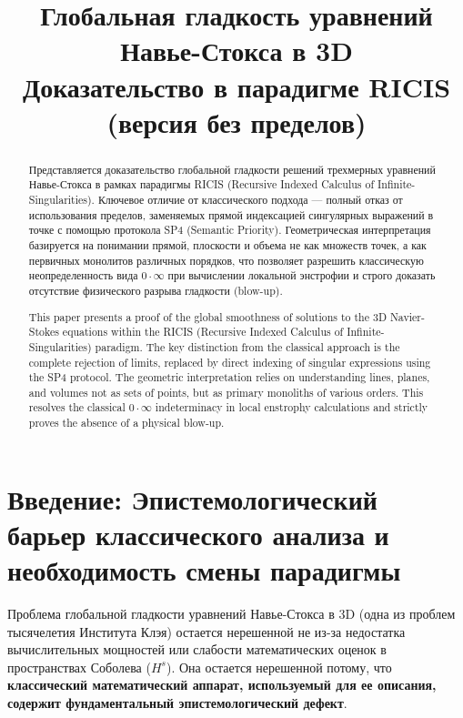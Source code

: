 \documentclass[12pt]{article}
\title{Глобальная гладкость уравнений Навье-Стокса в 3D \\
\large Доказательство в парадигме RICIS (версия без пределов)}
\author{}
\date{}
\newcommand{\0}{\mathbf{0}}
\newcommand{\1}{\mathds{1}}
\begin{document}
\maketitle

\begin{abstract}
Представляется доказательство глобальной гладкости решений трехмерных уравнений Навье-Стокса в рамках парадигмы RICIS (Recursive Indexed Calculus of Infinite-Singularities). Ключевое отличие от классического подхода --- полный отказ от использования пределов, заменяемых прямой индексацией сингулярных выражений в точке с помощью протокола SP4 (Semantic Priority). Геометрическая интерпретация базируется на понимании прямой, плоскости и объема не как множеств точек, а как первичных монолитов различных порядков, что позволяет разрешить классическую неопределенность вида $0 \cdot \infty$ при вычислении локальной энстрофии и строго доказать отсутствие физического разрыва гладкости (blow-up).
\end{abstract}
\renewcommand{\abstractname}{Abstract}
\begin{abstract}
This paper presents a proof of the global smoothness of solutions to the 3D Navier-Stokes equations within the RICIS (Recursive Indexed Calculus of Infinite-Singularities) paradigm. The key distinction from the classical approach is the complete rejection of limits, replaced by direct indexing of singular expressions using the SP4 protocol. The geometric interpretation relies on understanding lines, planes, and volumes not as sets of points, but as primary monoliths of various orders. This resolves the classical $0 \cdot \infty$ indeterminacy in local enstrophy calculations and strictly proves the absence of a physical blow-up.
\end{abstract}

\tableofcontents
\vspace{1cm}

\section*{Введение: Эпистемологический барьер классического анализа и необходимость смены парадигмы}

Проблема глобальной гладкости уравнений Навье-Стокса в 3D (одна из проблем тысячелетия Института Клэя) остается нерешенной не из-за недостатка вычислительных мощностей или слабости математических оценок в пространствах Соболева ($H^s$). Она остается нерешенной потому, что \textbf{классический математический аппарат, используемый для ее описания, содержит фундаментальный эпистемологический дефект}. 
\end{document}

